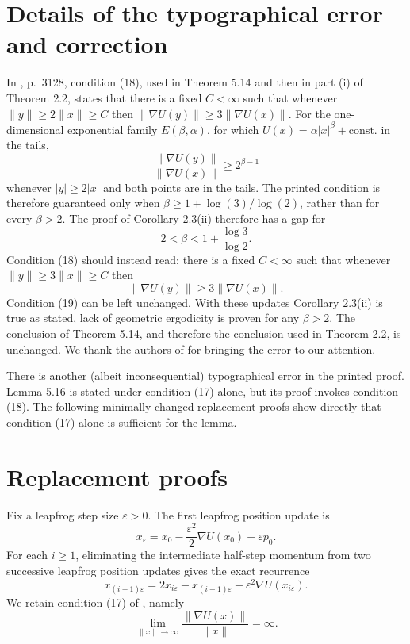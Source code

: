\section{Details of the typographical error and correction}

In \cite{Livingstone2019}, p.~3128, condition (18), used in Theorem 5.14 and
then in part (i) of Theorem 2.2, states that there is a fixed $C<\infty$ such
that whenever $\|y\|\geq2\|x\|\geq C$ then
$\|\nabla U(y)\|\geq3\|\nabla U(x)\|$. For the one-dimensional exponential
family $E(\beta,\alpha)$, for which $U(x)=\alpha|x|^\beta+\mathrm{const.}$ in
the tails,
\[
 \frac{\|\nabla U(y)\|}{\|\nabla U(x)\|}
 \geq 2^{\beta-1}
\]
whenever $|y|\geq2|x|$ and both points are in the tails.  The
printed condition is therefore guaranteed only when
$\beta\geq1+\log(3)/\log(2)$, rather than for every $\beta>2$. The proof
of Corollary 2.3(ii) therefore has a gap for
\[
 2<\beta<1+\frac{\log 3}{\log 2}.
\]
Condition (18) should instead read: there is a fixed $C<\infty$ such that
whenever $\|y\|\geq3\|x\|\geq C$ then
\begin{equation}
 \|\nabla U(y)\|\geq3\|\nabla U(x)\|.
 \tag{18}
 \label{eq:18}
\end{equation}
Condition (19) can be left unchanged. With these updates Corollary 2.3(ii) is true as stated, lack of geometric ergodicity is proven for any $\beta > 2$.  The conclusion of Theorem 5.14, and therefore
the conclusion used in Theorem 2.2, is unchanged. We thank the authors of \citep{gruffaz2026theoretical} for bringing the error to our attention.

There is another (albeit inconsequential) typographical error in the printed proof.  Lemma 5.16 is stated under
condition (17) alone, but its proof invokes condition (18). The following
minimally-changed replacement proofs show directly that condition (17) alone is sufficient for the lemma.

\section{Replacement proofs}

Fix a leapfrog step size $\varepsilon>0$. The first leapfrog position update
is
\begin{equation}
 x_{\varepsilon}
 =x_0-\frac{\varepsilon^2}{2}\nabla U(x_0)+\varepsilon p_0.
 \label{eq:firststep}
\end{equation}
For each $i\geq1$, eliminating the intermediate half-step momentum from two
successive leapfrog position updates gives the exact recurrence
\begin{equation}
 x_{(i+1)\varepsilon}
 =2x_{i\varepsilon}-x_{(i-1)\varepsilon}
 -\varepsilon^2\nabla U(x_{i\varepsilon}).
 \label{eq:recurrence}
\end{equation}
We retain condition (17) of \cite{Livingstone2019}, namely
\begin{equation}
 \lim_{\|x\|\to\infty}
 \frac{\|\nabla U(x)\|}{\|x\|}=\infty.
 \tag{17}
 \label{eq:17}
\end{equation}


